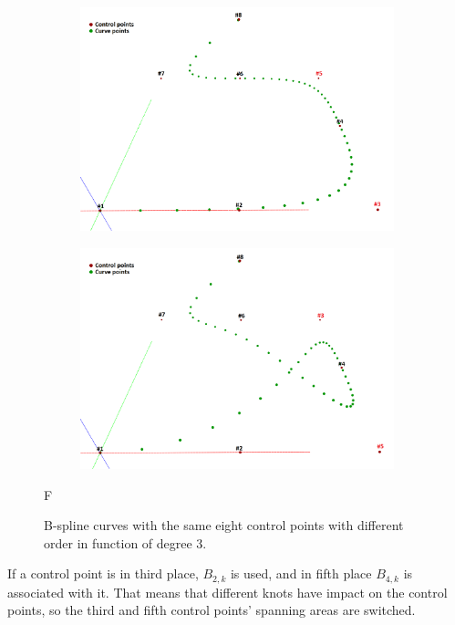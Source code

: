 \documentclass{article}
\begin{document}
\begin{figure}[H]
\centering
\begin{subfigure}[b]{0.48\textwidth}
\includegraphics[width=\textwidth]{bsplinecurve1}
\caption{}
\label{bsplincecurve1}
\end{subfigure}
\begin{subfigure}[b]{0.48\textwidth}
\includegraphics[width=\textwidth]{bsplinecurve2}
\caption{}
\label{bsplincecurve2}
\end{subfigure}
\caption{B-spline curves with the same eight control points with different order in function of degree 3.}F
\label{bsplinecurvecomparsion}
\end{figure}

If a control point is in third place, $B_{2,k}$ is used, and in fifth place $B_{4,k}$ is associated with it. That means that different knots have impact on the control points, so the third and fifth control points' spanning areas are switched.
\end{document}
